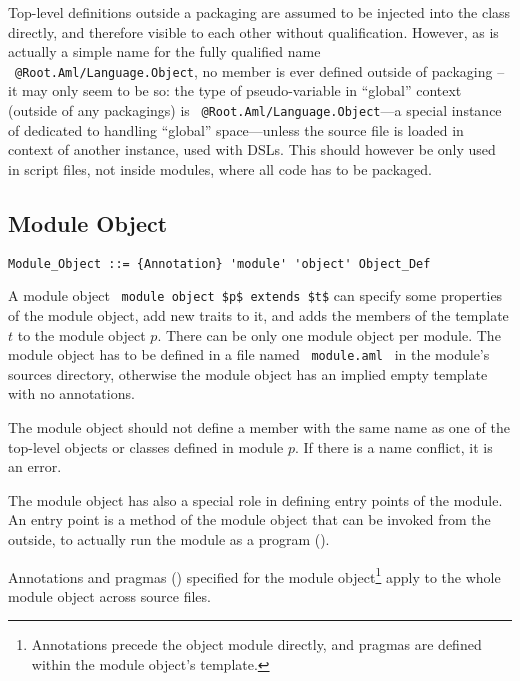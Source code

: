 Top-level definitions outside a packaging are assumed to be injected into the  class directly, and therefore visible to each other without qualification. However, as  is actually a simple name for the fully qualified name ~\lstinline!@Root.Aml/Language.Object!, no member is ever defined outside of packaging -- it may only seem to be so: the type of  pseudo-variable in ``global'' context (outside of any packagings) is ~\lstinline!@Root.Aml/Language.Object!---a special instance of  dedicated to handling ``global'' space---unless the source file is loaded in context of another instance, used with DSLs. This should however be only used in script files, not inside modules, where all code has to be packaged. 






\subsection{Module Object}

\syntax\begin{lstlisting}
Module_Object ::= {Annotation} 'module' 'object' Object_Def
\end{lstlisting}

A module object ~\lstinline!module object $p$ extends $t$! can specify some properties of the module object, add new traits to it, and adds the members of the template $t$ to the module object $p$. There can be only one module object per module. The module object has to be defined in a file named ~\lstinline[deletekeywords={module}]!module.aml!~ in the module's sources directory, otherwise the module object has an implied empty template with no annotations. 

The module object should not define a member with the same name as one of the top-level objects or classes defined in module $p$. If there is a name conflict, it is an error. 

The module object has also a special role in defining entry points of the module. An entry point is a method of the module object that can be invoked from the outside, to actually run the module as a program (). 

Annotations and pragmas () specified for the module object\footnote{Annotations precede the object module directly, and pragmas are defined within the module object's template.} apply to the whole module object across source files. 






